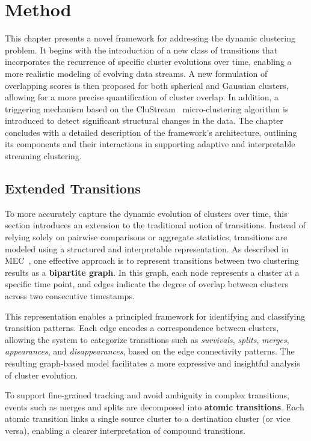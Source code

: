 \chapter{Method}\label{ch:method}

This chapter presents a novel framework for addressing the dynamic clustering
problem. It begins with the introduction of a new class of transitions that
incorporates the recurrence of specific cluster evolutions over time, enabling
a more realistic modeling of evolving data streams. A new formulation of
overlapping scores is then proposed for both spherical and Gaussian clusters,
allowing for a more precise quantification of cluster overlap. In addition, a
triggering mechanism based on the CluStream~\cite{clustream} micro-clustering
algorithm is introduced to detect significant structural changes in the data.
The chapter concludes with a detailed description of the framework's
architecture, outlining its components and their interactions in supporting
adaptive and interpretable streaming clustering.

\section{Extended Transitions}\label{sec:extended_transitions}

To more accurately capture the dynamic evolution of clusters over time, this
section introduces an extension to the traditional notion of transitions.
Instead of relying solely on pairwise comparisons or aggregate statistics,
transitions are modeled using a structured and interpretable representation. As
described in MEC~\cite{mec}, one effective approach is to represent transitions
between two clustering results as a \textbf{bipartite graph}. In this graph,
each node represents a cluster at a specific time point, and edges indicate the
degree of overlap between clusters across two consecutive timestamps.

This representation enables a principled framework for identifying and
classifying transition patterns. Each edge encodes a correspondence between
clusters, allowing the system to categorize transitions such as
\emph{survivals}, \emph{splits}, \emph{merges}, \emph{appearances}, and
\emph{disappearances}, based on the edge connectivity patterns. The resulting
graph-based model facilitates a more expressive and insightful analysis of
cluster evolution.



To support fine-grained tracking and avoid ambiguity in complex transitions,
events such as merges and splits are decomposed into \textbf{atomic
      transitions}. Each atomic transition links a single source cluster to a
destination cluster (or vice versa), enabling a clearer interpretation of
compound transitions.

